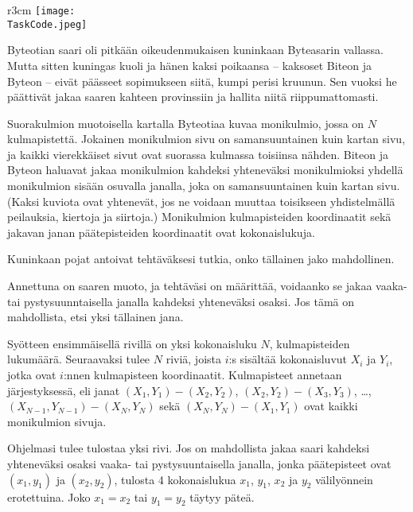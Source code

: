 \documentclass{boi2014-fi}
\renewcommand{\TaskCode}{demarcation}
\begin{document}
    \begin{wrapfigure}{r}{3cm}
        \vspace{-24pt}
        \texttt{[image: \\TaskCode.jpeg]}
    \end{wrapfigure}

    Byteotian saari oli pitkään oikeudenmukaisen kuninkaan Byteasarin vallassa.
    Mutta sitten kuningas kuoli ja hänen kaksi poikaansa --
    kaksoset Biteon ja Byteon -- eivät päässeet sopimukseen siitä,
    kumpi perisi kruunun.
    Sen vuoksi he päättivät jakaa saaren kahteen provinssiin
    ja hallita niitä riippumattomasti.

    Suorakulmion muotoisella kartalla Byteotiaa kuvaa monikulmio,
    jossa on $N$ kulmapistettä.
    Jokainen monikulmion sivu on samansuuntainen kuin kartan sivu,
    ja kaikki vierekkäiset sivut ovat suorassa kulmassa toisiinsa nähden.
    Biteon ja Byteon haluavat jakaa monikulmion kahdeksi yhteneväksi monikulmioksi
    yhdellä monikulmion sisään osuvalla janalla, joka on samansuuntainen
    kuin kartan sivu.
    (Kaksi kuviota ovat yhtenevät, jos ne voidaan muuttaa toisikseen
     yhdistelmällä peilauksia, kiertoja ja siirtoja.)
    Monikulmion kulmapisteiden koordinaatit sekä jakavan janan
    päätepisteiden koordinaatit ovat kokonaislukuja.

    Kuninkaan pojat antoivat tehtäväksesi tutkia,
    onko tällainen jako mahdollinen.

    \Task
    Annettuna on saaren muoto,
    ja tehtäväsi on määrittää, voidaanko se jakaa
    vaaka- tai pystysuunntaisella janalla kahdeksi yhteneväksi osaksi.
    Jos tämä on mahdollista, etsi yksi tällainen jana.
    
    \Input
    Syötteen ensimmäisellä rivillä on yksi kokonaisluku $N$,
    kulmapisteiden lukumäärä.
    Seuraavaksi tulee $N$ riviä, joista $i$:s sisältää kokonaisluvut
    $X_i$ ja $Y_i$, jotka ovat $i$:nnen kulmapisteen koordinaatit.
    Kulmapisteet annetaan järjestyksessä, eli
    janat $(X_1,Y_1) - (X_2,Y_2)$, $(X_2,Y_2) - (X_3,Y_3)$, \ldots, $(X_{N-1},Y_{N-1}) - (X_N,Y_N)$ sekä
    $(X_N,Y_N) - (X_1,Y_1)$ ovat kaikki monikulmion sivuja.


    \Output
    Ohjelmasi tulee tulostaa yksi rivi.
    Jos on mahdollista jakaa saari kahdeksi yhteneväksi osaksi
    vaaka- tai pystysuuntaisella janalla,
    jonka päätepisteet ovat $(x_1, y_1)$ ja $(x_2, y_2)$,
    tulosta 4 kokonaislukua $x_1$,
    $y_1$, $x_2$ ja $y_2$ välilyönnein erotettuina.
    Joko $x_1 = x_2$ tai $y_1 = y_2$ täytyy päteä.
\end{document}
